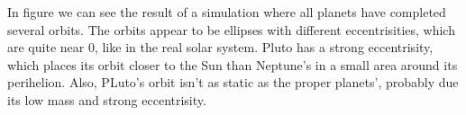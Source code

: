 
In figure  we can see the result of a simulation where all planets have completed several orbits. The orbits appear to be ellipses with different eccentrisities, which are quite near $0$, like in the real solar system. Pluto has a strong eccentrisity, which places its orbit closer to the Sun than Neptune's in a small area around its perihelion. Also, PLuto's orbit isn't as static as the proper planets', probably due its low mass and strong eccentrisity.
